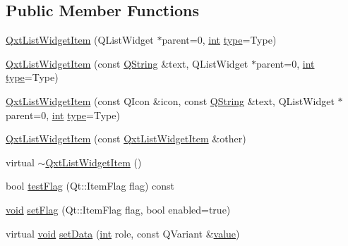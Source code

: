 \subsection*{Public Member Functions}
\begin{DoxyCompactItemize}
\item 
\hyperlink{class_qxt_list_widget_item_a45732d22a03c490686a2daa27d6e819e}{Qxt\-List\-Widget\-Item} (Q\-List\-Widget $\ast$parent=0, \hyperlink{ioapi_8h_a787fa3cf048117ba7123753c1e74fcd6}{int} \hyperlink{glext_8h_a7d05960f4f1c1b11f3177dc963a45d86}{type}=Type)
\item 
\hyperlink{class_qxt_list_widget_item_a1b0470341c25d828739dfdba7aae6c5c}{Qxt\-List\-Widget\-Item} (const \hyperlink{group___u_a_v_objects_plugin_gab9d252f49c333c94a72f97ce3105a32d}{Q\-String} \&text, Q\-List\-Widget $\ast$parent=0, \hyperlink{ioapi_8h_a787fa3cf048117ba7123753c1e74fcd6}{int} \hyperlink{glext_8h_a7d05960f4f1c1b11f3177dc963a45d86}{type}=Type)
\item 
\hyperlink{class_qxt_list_widget_item_a1b9dd54987e03303d516c771618e591d}{Qxt\-List\-Widget\-Item} (const Q\-Icon \&icon, const \hyperlink{group___u_a_v_objects_plugin_gab9d252f49c333c94a72f97ce3105a32d}{Q\-String} \&text, Q\-List\-Widget $\ast$parent=0, \hyperlink{ioapi_8h_a787fa3cf048117ba7123753c1e74fcd6}{int} \hyperlink{glext_8h_a7d05960f4f1c1b11f3177dc963a45d86}{type}=Type)
\item 
\hyperlink{class_qxt_list_widget_item_ad1e7f928e14a22cde1d96f3c1567d22c}{Qxt\-List\-Widget\-Item} (const \hyperlink{class_qxt_list_widget_item}{Qxt\-List\-Widget\-Item} \&other)
\item 
virtual \hyperlink{class_qxt_list_widget_item_a5551d94a3619d21f2b43dd4598e6e3ac}{$\sim$\-Qxt\-List\-Widget\-Item} ()
\item 
bool \hyperlink{class_qxt_list_widget_item_a181b60f0c1c69568f5760b8dbe99e83d}{test\-Flag} (Qt\-::\-Item\-Flag flag) const 
\item 
\hyperlink{group___u_a_v_objects_plugin_ga444cf2ff3f0ecbe028adce838d373f5c}{void} \hyperlink{class_qxt_list_widget_item_a9c84f101b3b4f8e36e34204170069ff7}{set\-Flag} (Qt\-::\-Item\-Flag flag, bool enabled=true)
\item 
virtual \hyperlink{group___u_a_v_objects_plugin_ga444cf2ff3f0ecbe028adce838d373f5c}{void} \hyperlink{class_qxt_list_widget_item_a02bc8104cff571705521f579a5ad0d60}{set\-Data} (\hyperlink{ioapi_8h_a787fa3cf048117ba7123753c1e74fcd6}{int} role, const Q\-Variant \&\hyperlink{glext_8h_aa0e2e9cea7f208d28acda0480144beb0}{value})
\end{DoxyCompactItemize}


